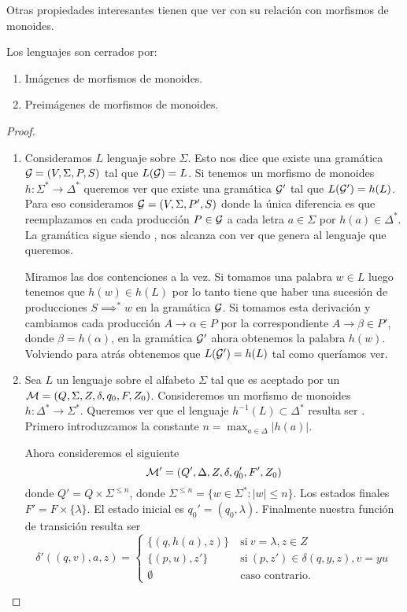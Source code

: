\documentclass[tesis.tex]{subfiles}
\begin{document}
Otras propiedades interesantes tienen que ver con su relación con morfismos de monoides. 
\begin{prop}\label{morfismos-monoides-ic}
	Los lenguajes \ic son cerrados por:
	\begin{enumerate}
		\item Imágenes de morfismos de monoides.
		\item Preimágenes de morfismos de monoides.
	\end{enumerate}
	
\end{prop}

\begin{proof}
	\begin{enumerate} 
		\item Consideramos $L$ lenguaje \ic sobre $\Sigma$.
		Esto nos dice que existe una gramática ${\cal G} = (V, \Sigma, P, S) $ tal que $L({\cal G}) = L$.
		Si tenemos un morfismo de monoides $h: \Sigma^* \to \Delta^*$ queremos ver que existe una gramática ${\cal G}'$ tal que $L({\cal G}') = h(L)$.
		Para eso consideramos ${\cal G}  = (V, \Sigma, P', S)$ donde la única diferencia es que reemplazamos en cada producción $P \in {\cal G}$ a cada letra $a \in \Sigma$ por $h(a) \in \Delta^*$.
		La gramática sigue siendo \ic, nos alcanza con ver que genera al lenguaje que queremos.
		
		Miramos las dos contenciones a la vez.		
		Si tomamos una palabra $w \in L$ luego tenemos que $h(w) \in h(L)$ por lo tanto tiene que haber una sucesión de producciones $S  \implies^* w  $ en la gramática ${\cal G}$.
		Si tomamos esta derivación y cambiamos cada producción $A \to \alpha \in P$ por la correspondiente $A \to \beta \in P'$, donde $\beta = h(\alpha)$, en la gramática ${\cal G}'$ ahora obtenemos la palabra $h(w)$.
		Volviendo para atrás obtenemos que $L({\cal G}') = h(L)$ tal como queríamos ver.
		
		\item Sea $L$ un lenguaje \ic sobre el alfabeto $\Sigma$ tal que es aceptado por un \APND ${\cal M } = (Q, \Sigma, Z, \delta, q_0, F, Z_0)$.
		Consideremos un morfismo de monoides $h: \Delta^* \to \Sigma^*$. 
		Queremos ver que el lenguaje $h^{-1}(L) \subset \Delta^*$ resulta ser \ic. 
		Primero introduzcamos la constante $ n = \max_{a \in \Delta} |h(a)|$.
		
		Ahora consideremos el siguiente \APND 
		\[
			{\cal M' } = (Q', \Delta, Z, \delta, q_0', F', Z_0)
		\]
		donde $Q' = Q \times \Sigma^{\le n}$, donde $\Sigma^{\le n} = \{ w \in \Sigma^* : |w| \le n  \}$.
		Los estados finales $F' = F \times \{ \lambda \}$.
		El estado inicial es $q_0' = (q_0, \lambda)$.
		Finalmente nuestra función de transición resulta ser 
		\[
		\delta'((q,v), a ,z) = 
		\begin{cases}
		\{(q,h(a), z )\}  \ &\text{si} \ v=\lambda, z \in Z \\
		\{(p,u),z' \} \ &\text{si} \ (p,z') \in \delta(q,y,z), v=yu \\  
		\emptyset \ &\text{caso contrario}.
		\end{cases}
		\]
		

\end{enumerate}
\end{proof}
\end{document}
